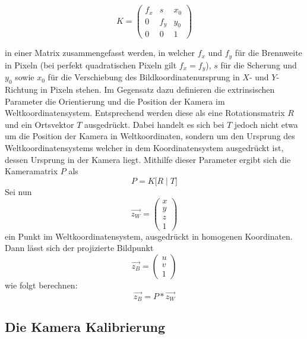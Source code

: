\begin{equation}
K = \begin{pmatrix}
f_x & s & x_0 \\
0 & f_y & y_0 \\
0 & 0 & 1 
\end{pmatrix}
\end{equation}

 in einer Matrix zusammengefasst werden, in welcher \(f_x\) und \(f_y\) für die Brennweite in Pixeln (bei perfekt quadratischen Pixeln gilt \(f_x = f_y\)), \(s\) für die Scherung und \(y_0\) sowie \(x_0\) für die Verschiebung des Bildkoordinatenursprung in \(X\)- und \(Y\)-Richtung in Pixeln stehen. 
\newline
Im Gegensatz dazu definieren die extrinsischen Parameter die Orientierung und die Position der Kamera im Weltkoordinatensystem. Entsprechend werden diese als eine Rotationsmatrix \(R\) und ein Ortsvektor \(T\) ausgedrückt. Dabei handelt es sich bei \(T\) jedoch nicht etwa um die Position der Kamera in Weltkoordinaten, sondern um den Ursprung des Weltkoordinatensystems welcher in dem Koordinatensystem ausgedrückt ist, dessen Ursprung in der Kamera liegt.
\newline
Mithilfe dieser Parameter ergibt sich die Kameramatrix \(P\) als
\begin{equation}
	P = K \big[ R \mid T \big] 
\end{equation}
Sei nun 
\begin{equation}
	\vec{z_{W}} = \left(\begin{array}{c}x\\y\\z\\1\end{array}\right)
\end{equation}
ein Punkt im Weltkoordinatensystem, ausgedrückt in homogenen Koordinaten. Dann lässt sich der projizierte Bildpunkt
\begin{equation}
	\vec{z_{B}} = \left(\begin{array}{c}u\\v\\1\end{array}\right)
\end{equation}
wie folgt berechnen:
\begin{equation}
	\vec{z_{B}} = P * \vec{z_{W}}
\end{equation}


\subsection{Die Kamera Kalibrierung}
\label{subsec:KameraKalibrierungTheorie}

